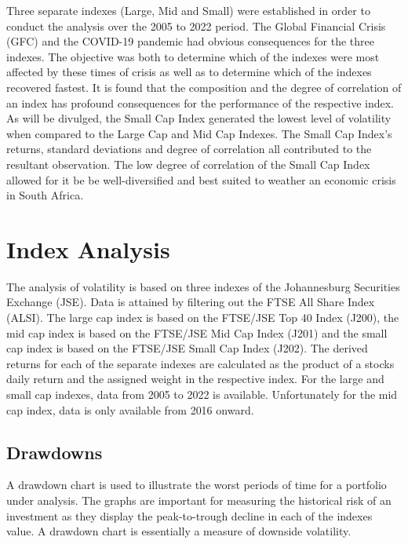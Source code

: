 \documentclass[11pt,preprint, authoryear]{elsarticle}
\numberwithin{equation}{section}
\numberwithin{figure}{section}
\numberwithin{table}{section}
\begin{document}
Three separate indexes (Large, Mid and Small) were established in order
to conduct the analysis over the 2005 to 2022 period. The Global
Financial Crisis (GFC) and the COVID-19 pandemic had obvious
consequences for the three indexes. The objective was both to determine
which of the indexes were most affected by these times of crisis as well
as to determine which of the indexes recovered fastest. It is found that
the composition and the degree of correlation of an index has profound
consequences for the performance of the respective index. As will be
divulged, the Small Cap Index generated the lowest level of volatility
when compared to the Large Cap and Mid Cap Indexes. The Small Cap
Index's returns, standard deviations and degree of correlation all
contributed to the resultant observation. The low degree of correlation
of the Small Cap Index allowed for it be be well-diversified and best
suited to weather an economic crisis in South Africa.

\hypertarget{index-analysis}{%
\section{\texorpdfstring{Index Analysis
\label{Index}}{Index Analysis }}\label{index-analysis}}

The analysis of volatility is based on three indexes of the Johannesburg
Securities Exchange (JSE). Data is attained by filtering out the FTSE
All Share Index (ALSI). The large cap index is based on the FTSE/JSE Top
40 Index (J200), the mid cap index is based on the FTSE/JSE Mid Cap
Index (J201) and the small cap index is based on the FTSE/JSE Small Cap
Index (J202). The derived returns for each of the separate indexes are
calculated as the product of a stocks daily return and the assigned
weight in the respective index. For the large and small cap indexes,
data from 2005 to 2022 is available. Unfortunately for the mid cap
index, data is only available from 2016 onward.

\hypertarget{drawdowns}{%
\subsection{Drawdowns}\label{drawdowns}}

A drawdown chart is used to illustrate the worst periods of time for a
portfolio under analysis. The graphs are important for measuring the
historical risk of an investment as they display the peak-to-trough
decline in each of the indexes value. A drawdown chart is essentially a
measure of downside volatility.
\end{document}
